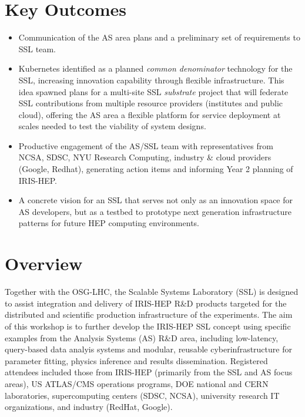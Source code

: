 \documentclass[11pt,letterpaper,fleqn]{article}
\begin{document}
\section*{Key Outcomes}
\vspace{3pt}
\begin{itemize}
  \item Communication of the AS area plans and a preliminary set of requirements to SSL team.
  \item Kubernetes identified as a planned {\it common denominator} technology for the SSL, increasing innovation capability through flexible infrastructure.  This idea spawned plans for a multi-site SSL {\it substrate} project that will federate SSL contributions from multiple resource providers (institutes and public cloud), offering the AS area a flexible platform for service deployment at scales needed to test the viability of system designs.
  \item Productive engagement of the AS/SSL team with representatives from NCSA, SDSC, NYU Research Computing, industry \& cloud providers (Google, Redhat), generating action items and informing Year 2 planning of IRIS-HEP.
  \item A concrete vision for an SSL that serves not only as an innovation space for AS developers, but as a testbed to prototype next generation infrastructure patterns for future HEP computing environments.

\end{itemize}


\newpage
\pagestyle{reststyle}

\section{Overview}
\vspace{0.2cm}
Together with the OSG-LHC, the Scalable Systems Laboratory (SSL) is designed to assist integration and delivery of IRIS-HEP R\&D products targeted for the distributed and scientific production infrastructure of the experiments. The aim of this workshop is to further develop the IRIS-HEP SSL concept using specific examples from the Analysis Systems (AS) R\&D area, including low-latency, query-based data analyis systems and modular, reusable cyberinfrastructure for parameter fitting, physics inference and results dissemination. Registered attendees included those from IRIS-HEP (primarily from the SSL and AS focus areas), US ATLAS/CMS operations programs, DOE national and CERN laboratories, supercomputing centers (SDSC, NCSA), university research IT organizations, and industry (RedHat, Google).
\end{document}
